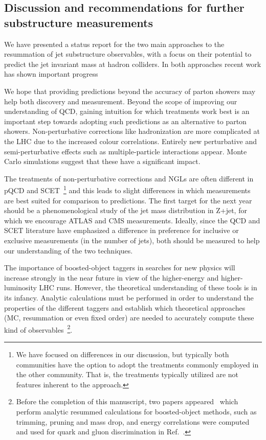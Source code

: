 \subsection{Discussion and recommendations for further substructure measurements}
\label{subsec:rec}

We have presented a status report for the two main approaches to 
the resummation of jet substructure observables, with a 
focus on their potential to 
predict the jet invariant mass at hadron colliders. In both approaches
recent work has shown important progress

We hope that providing predictions beyond the accuracy of 
parton showers may help both discovery and 
measurement. Beyond the scope of improving our understanding of QCD, 
gaining intuition for which treatments work best is an important step 
towards adopting such predictions as an alternative to parton showers. 
Non-perturbative corrections like 
hadronization are more complicated at the LHC due to the increased colour 
correlations. Entirely new perturbative and semi-perturbative 
effects such as multiple-particle interactions appear. 
Monte Carlo simulations suggest that these have a significant impact.

The treatments of non-perturbative corrections and NGLs are 
often different in pQCD and SCET~\footnote{We have focused on differences in our
discussion, but typically both communities have the option to adopt the 
treatments commonly employed in the other community. That is, the treatments 
typically utilized are not features inherent to the approach.} and this
leads to slight differences in which measurements are best suited for
comparison to predictions. The first target for the next year should 
be a phenomenological study of the jet mass distribution in Z+jet, for 
which we encourage ATLAS and CMS measurements. Ideally, since the QCD and SCET 
literature have emphasized a difference in preference for inclusive
or exclusive measurements (in the number of jets),
both should be measured to help our understanding of the two 
techniques.

The importance of  boosted-object taggers in searches for new physics 
will increase strongly in the near future in view of the 
higher-energy and higher-luminosity LHC runs. However, the theoretical 
understanding of these tools is in its infancy. Analytic calculations 
must be performed in order to understand the properties of the different 
taggers and establish which theoretical approaches 
(MC, resummation or even fixed order) are needed to accurately compute 
these kind of observables~\footnote{Before the completion of this 
manuscript, two papers appeared~\cite{Dasgupta:2013tia,Dasgupta:2013via} 
which perform analytic resummed calculations for boosted-object methods, 
such as trimming, pruning and mass drop, and energy correlations were 
computed and used for quark and gluon discrimination in 
Ref.~\cite{Larkoski:2013eya}.}.





